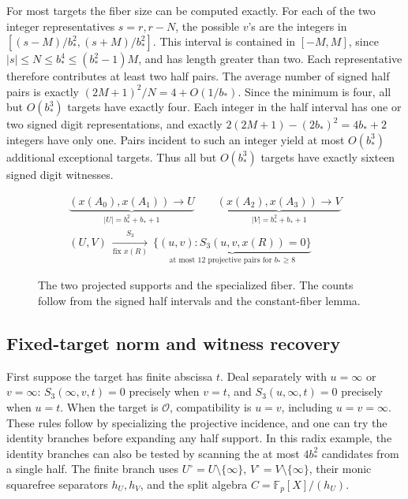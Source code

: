\documentclass[11pt]{article}
\newcommand{\Fp}{\mathbb F_p}
\newcommand{\OO}{\mathcal O}
\begin{document}
For most targets the fiber size can be computed exactly. For each of the two integer representatives \(s=r,r-N\), the possible \(v\)'s are the integers in \([(s-M)/b_*^2,(s+M)/b_*^2]\). This interval is contained in \([-M,M]\), since \(|s|\le N\le b_*^4\le(b_*^2-1)M\), and has length greater than two. Each representative therefore contributes at least two half pairs. The average number of signed half pairs is exactly \((2M+1)^2/N=4+O(1/b_*)\). Since the minimum is four, all but \(O(b_*^3)\) targets have exactly four. Each integer in the half interval has one or two signed digit representations, and exactly \(2(2M+1)-(2b_*)^2=4b_*+2\) integers have only one. Pairs incident to such an integer yield at most \(O(b_*^3)\) additional exceptional targets. Thus all but \(O(b_*^3)\) targets have exactly sixteen signed digit witnesses.

\begin{figure}[htbp]
\centering
\[
\begin{gathered}
 \underbrace{(x(A_0),x(A_1))\longrightarrow U}_{|U|=b_*^2+b_*+1}
 \qquad
 \underbrace{(x(A_2),x(A_3))\longrightarrow V}_{|V|=b_*^2+b_*+1}
 \\[4pt]
 (U,V)\ \xrightarrow[\text{fix }x(R)]{\,S_3\,}\
 \underbrace{\{(u,v): S_3(u,v,x(R))=0\}}_{\text{at most 12 projective pairs for }b_*\ge8}
\end{gathered}
\]
\caption{The two projected supports and the specialized fiber. The counts follow from the signed half intervals and the constant-fiber lemma.}
\end{figure}

\subsection*{Fixed-target norm and witness recovery}

First suppose the target has finite abscissa \(t\). Deal separately with \(u=\infty\) or \(v=\infty\): \(S_3(\infty,v,t)=0\) precisely when \(v=t\), and \(S_3(u,\infty,t)=0\) precisely when \(u=t\). When the target is \(\OO\), compatibility is \(u=v\), including \(u=v=\infty\). These rules follow by specializing the projective incidence, and one can try the identity branches before expanding any half support. In this radix example, the identity branches can also be tested by scanning the at most \(4b_*^2\) candidates from a single half. The finite branch uses \(U^\circ=U\setminus\{\infty\}\), \(V^\circ=V\setminus\{\infty\}\), their monic squarefree separators \(h_U,h_V\), and the split algebra \(C=\Fp[X]/(h_U)\).
\end{document}
